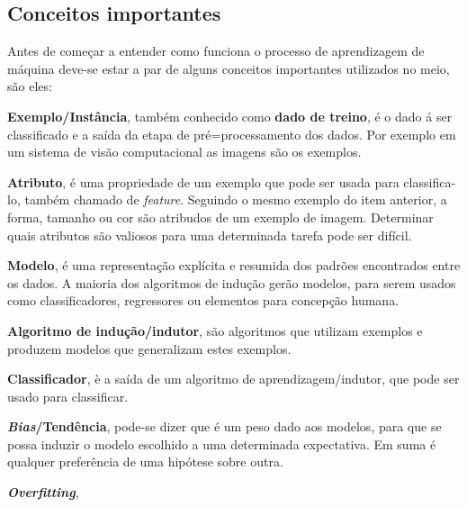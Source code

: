  \subsection{Conceitos importantes}
 \label{subsec:conceitos}
 Antes de começar a entender como funciona o processo de aprendizagem de máquina deve-se estar a par de alguns conceitos importantes 
 utilizados no meio, são eles:
  \begin{alineas}
  	\item \textbf{Exemplo/Instância}, também conhecido como \textbf{dado de treino}, é o dado á ser classificado e a saída da etapa de pré=processamento dos dados.
	Por exemplo em um sistema de visão computacional as imagens são os exemplos.
	\item \textbf{Atributo}, é uma propriedade de um exemplo que pode ser usada para classifica-lo, também chamado de \textit{feature}. Seguindo o mesmo exemplo do item anterior,
	a forma, tamanho ou cor são atribudos de um exemplo de imagem. Determinar quais atributos são valiosos para uma determinada tarefa pode 
	ser difícil.
	\item \textbf{Modelo}, é uma representação explícita e resumida dos padrões encontrados entre os dados. A maioria dos algoritmos de indução gerão modelos,
	para serem usados como classificadores, regressores ou elementos para concepção humana.
	\item \textbf{Algoritmo de indução/indutor}, são algoritmos que utilizam exemplos e produzem modelos que generalizam estes exemplos.
	\item \textbf{Classificador}, è a saída de um algoritmo de aprendizagem/indutor, que pode ser usado para classificar.	
	\item \textbf{\textit{Bias}/Tendência}, pode-se dizer que é um peso dado aos modelos, para que se possa induzir o modelo escolhido
	 a uma determinada expectativa. Em suma é qualquer preferência de uma hipótese sobre outra.
	 \item \textbf{\textit{Overfitting}},
  \end{alineas}  
